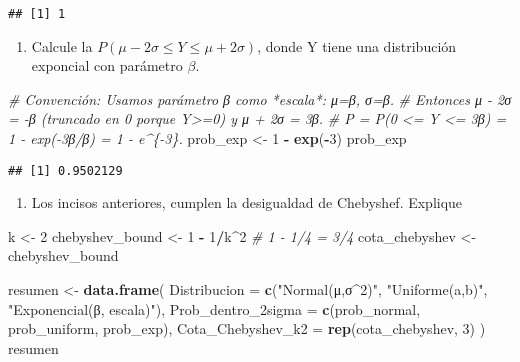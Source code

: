 \documentclass[
]{article}
\newenvironment{Shaded}{\begin{snugshade}}{\end{snugshade}}
\newcommand{\AttributeTok}[1]{\textcolor[rgb]{0.13,0.29,0.53}{#1}}
\newcommand{\CommentTok}[1]{\textcolor[rgb]{0.56,0.35,0.01}{\textit{#1}}}
\newcommand{\DecValTok}[1]{\textcolor[rgb]{0.00,0.00,0.81}{#1}}
\newcommand{\FunctionTok}[1]{\textcolor[rgb]{0.13,0.29,0.53}{\textbf{#1}}}
\newcommand{\NormalTok}[1]{#1}
\newcommand{\OtherTok}[1]{\textcolor[rgb]{0.56,0.35,0.01}{#1}}
\newcommand{\SpecialCharTok}[1]{\textcolor[rgb]{0.81,0.36,0.00}{\textbf{#1}}}
\newcommand{\StringTok}[1]{\textcolor[rgb]{0.31,0.60,0.02}{#1}}
\providecommand{\tightlist}{%
  \setlength{\itemsep}{0pt}\setlength{\parskip}{0pt}}
\begin{document}
\begin{verbatim}
## [1] 1
\end{verbatim}

\begin{enumerate}
\def\labelenumi{\alph{enumi})}
\setcounter{enumi}{2}
\tightlist
\item
  Calcule la \(P(\mu − 2\sigma ≤ Y ≤ \mu + 2\sigma)\), donde Y tiene una
  distribución exponcial con parámetro \(\beta\).
\end{enumerate}

\begin{Shaded}
\begin{Highlighting}[]
\CommentTok{\# Convención: Usamos parámetro β como *escala*: μ=β, σ=β.}
\CommentTok{\# Entonces μ {-} 2σ = {-}β (truncado en 0 porque Y\textgreater{}=0) y μ + 2σ = 3β.}
\CommentTok{\# P = P(0 \textless{}= Y \textless{}= 3β) = 1 {-} exp({-}3β/β) = 1 {-} e\^{}\{{-}3\}.}
\NormalTok{prob\_exp }\OtherTok{\textless{}{-}} \DecValTok{1} \SpecialCharTok{{-}} \FunctionTok{exp}\NormalTok{(}\SpecialCharTok{{-}}\DecValTok{3}\NormalTok{)}
\NormalTok{prob\_exp}
\end{Highlighting}
\end{Shaded}

\begin{verbatim}
## [1] 0.9502129
\end{verbatim}

\begin{enumerate}
\def\labelenumi{\alph{enumi})}
\setcounter{enumi}{3}
\tightlist
\item
  Los incisos anteriores, cumplen la desigualdad de Chebyshef. Explique
\end{enumerate}

\begin{Shaded}
\begin{Highlighting}[]
\NormalTok{k }\OtherTok{\textless{}{-}} \DecValTok{2}
\NormalTok{chebyshev\_bound }\OtherTok{\textless{}{-}} \DecValTok{1} \SpecialCharTok{{-}} \DecValTok{1}\SpecialCharTok{/}\NormalTok{k}\SpecialCharTok{\^{}}\DecValTok{2}  \CommentTok{\# 1 {-} 1/4 = 3/4}
\NormalTok{cota\_chebyshev }\OtherTok{\textless{}{-}}\NormalTok{ chebyshev\_bound}

\NormalTok{resumen }\OtherTok{\textless{}{-}} \FunctionTok{data.frame}\NormalTok{(}
  \AttributeTok{Distribucion =} \FunctionTok{c}\NormalTok{(}\StringTok{"Normal(μ,σ\^{}2)"}\NormalTok{, }\StringTok{"Uniforme(a,b)"}\NormalTok{, }\StringTok{"Exponencial(β, escala)"}\NormalTok{),}
  \AttributeTok{Prob\_dentro\_2sigma =} \FunctionTok{c}\NormalTok{(prob\_normal, prob\_uniform, prob\_exp),}
  \AttributeTok{Cota\_Chebyshev\_k2 =} \FunctionTok{rep}\NormalTok{(cota\_chebyshev, }\DecValTok{3}\NormalTok{)}
\NormalTok{)}
\NormalTok{resumen}
\end{Highlighting}
\end{Shaded}
\end{document}
